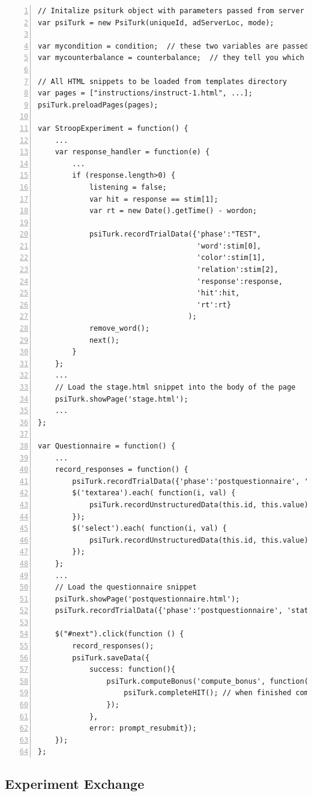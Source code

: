 \documentclass[twocolumn]{svjour3}          %
\begin{document}
\begin{lstlisting}[float=*,numbers=left,numberstyle=\small\color{gray},caption=Condensed version of JavaScript code for Stroop experiment,label=code.lst]
// Initalize psiturk object with parameters passed from server (see templates/exp.html)
var psiTurk = new PsiTurk(uniqueId, adServerLoc, mode);

var mycondition = condition;  // these two variables are passed by the psiturk server process
var mycounterbalance = counterbalance;  // they tell you which condition you have been assigned to

// All HTML snippets to be loaded from templates directory
var pages = ["instructions/instruct-1.html", ...];
psiTurk.preloadPages(pages);

var StroopExperiment = function() {
	...	
	var response_handler = function(e) {
		...
		if (response.length>0) {
			listening = false;
			var hit = response == stim[1];
			var rt = new Date().getTime() - wordon;

			psiTurk.recordTrialData({'phase':"TEST",
                                     'word':stim[0],
                                     'color':stim[1],
                                     'relation':stim[2],
                                     'response':response,
                                     'hit':hit,
                                     'rt':rt}
                                   );
			remove_word();
			next();
		}
	};
	...	
	// Load the stage.html snippet into the body of the page
	psiTurk.showPage('stage.html');
	...
};

var Questionnaire = function() {
	...
	record_responses = function() {
		psiTurk.recordTrialData({'phase':'postquestionnaire', 'status':'submit'});
		$('textarea').each( function(i, val) {
			psiTurk.recordUnstructuredData(this.id, this.value);
		});
		$('select').each( function(i, val) {
			psiTurk.recordUnstructuredData(this.id, this.value);		
		});
	};
	... 
	// Load the questionnaire snippet 
	psiTurk.showPage('postquestionnaire.html');
	psiTurk.recordTrialData({'phase':'postquestionnaire', 'status':'begin'});
	
	$("#next").click(function () {
		record_responses();	
		psiTurk.saveData({
			success: function(){
			    psiTurk.computeBonus('compute_bonus', function() { 
			    	psiTurk.completeHIT(); // when finished computing bonus, quit
			    }); 
			}, 
			error: prompt_resubmit});
	});
};
\end{lstlisting}

\subsection{Experiment Exchange}
\end{document}
